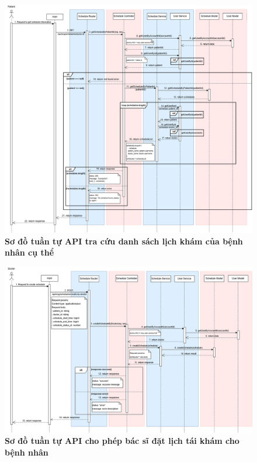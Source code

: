 \begin{figure}[H]
	\centering
	\includegraphics[width=16cm]{Images/api_sequence/schedule/getScheduleByPatientId.drawio.png}
	\caption[Sơ đồ tuần tự API tra cứu danh sách lịch khám của bệnh nhân cụ thể]{\bfseries \fontsize{12pt}{0pt}\selectfont Sơ đồ tuần tự API tra cứu danh sách lịch khám của bệnh nhân cụ thể}
	\label{sequence_diagram_get_schedule_by_patient}
\end{figure}

\begin{figure}[H]
	\centering
	\includegraphics[width=16cm]{Images/api_sequence/schedule/createScheduleByDoctor.drawio.png}
	\caption[Sơ đồ tuần tự API cho phép bác sĩ đặt lịch tái khám cho bệnh nhân]{\bfseries \fontsize{12pt}{0pt}\selectfont Sơ đồ tuần tự API cho phép bác sĩ đặt lịch tái khám cho bệnh nhân}
	\label{sequence_diagram_create_schedule_by_doctor}
\end{figure}

